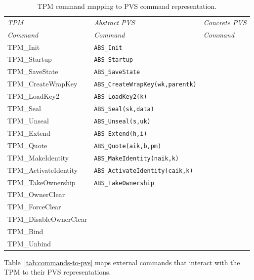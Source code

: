 \documentclass[10pt]{article}
\begin{document}
\begin{table}[hbtp]
  \centering
  \begin{tabular}{lll}
    \hline
    \emph{TPM} & \emph{Abstract PVS} & \emph{Concrete PVS} \\
    \emph{Command} & \emph{Command} & \emph{Command} \\ \hline
    \textsf{TPM\_Init} & \verb+ABS_Init+ & \\ 
    \textsf{TPM\_Startup} & \verb+ABS_Startup+ & \\
    \textsf{TPM\_SaveState} & \verb+ABS_SaveState+ & \\
    \textsf{TPM\_CreateWrapKey} & \verb+ABS_CreateWrapKey(wk,parentk)+ & \\
    \textsf{TPM\_LoadKey2} & \verb+ABS_LoadKey2(k)+ & \\
    \textsf{TPM\_Seal} & \verb+ABS_Seal(sk,data)+& \\
    \textsf{TPM\_Unseal} & \verb+ABS_Unseal(s,uk)+ & \\
    \textsf{TPM\_Extend} & \verb+ABS_Extend(h,i)+ & \\
    \textsf{TPM\_Quote} & \verb+ABS_Quote(aik,b,pm)+ & \\
    \textsf{TPM\_MakeIdentity} & \verb+ABS_MakeIdentity(naik,k)+ & \\
    \textsf{TPM\_ActivateIdentity} & \verb+ABS_ActivateIdentity(caik,k)+ & \\
    \textsf{TPM\_TakeOwnership} & \verb+ABS_TakeOwnership+ & \\
    \textsf{TPM\_OwnerClear} & & \\
    \textsf{TPM\_ForceClear} & & \\ 
    \textsf{TPM\_DisableOwnerClear} & & \\
    \textsf{TPM\_Bind} & & \\
    \textsf{TPM\_Unbind} & & \\
    \hline
  \end{tabular}
  \caption{TPM command mapping to PVS command representation.}
  \label{tab:tpm-to-pvs}
\end{table}

Table~\ref{tab:commands-to-pvs} maps external commands that interact
with the TPM to their PVS representations.
\end{document}
